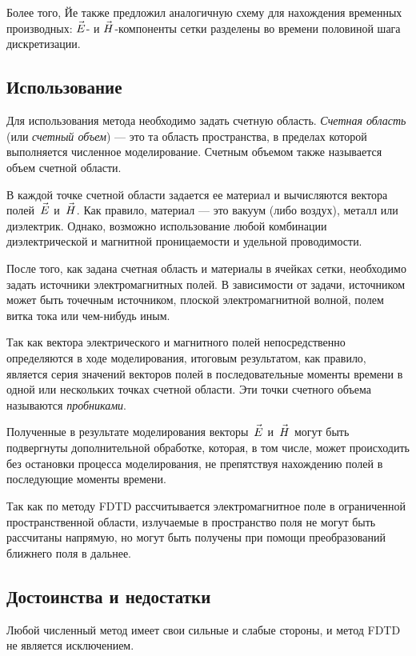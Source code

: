 Более того, Йе также предложил аналогичную схему для нахождения временных
производных: $\vec{E\mathstrut}$- и $\vec{H\mathstrut}$-компоненты сетки разделены во времени
половиной шага дискретизации.


\subsection{Использование}

Для использования метода необходимо задать счетную область.
\emph{Счетная область} (или \emph{счетный объем}) --- это та область
пространства, в пределах которой выполняется численное моделирование.
Счетным объемом также называется объем счетной области.

В каждой точке счетной области задается ее материал и вычисляются вектора
полей~$\vec{E\mathstrut}$ и~$\vec{H\mathstrut}$. Как правило, материал --- это вакуум (либо
воздух), металл или диэлектрик. Однако, возможно использование любой комбинации
диэлектрической и магнитной проницаемости и удельной проводимости.

После того, как задана счетная область и материалы в ячейках сетки, необходимо
задать источники электромагнитных полей. В зависимости от задачи, источником
может быть точечным источником, плоской электромагнитной волной, полем витка
тока или чем-нибудь иным.

Так как вектора электрического и магнитного полей непосредственно определяются
в ходе моделирования, итоговым результатом, как правило, является серия значений
векторов полей в последовательные моменты времени в одной или нескольких точках
счетной области. Эти точки счетного объема называются \emph{пробниками}.

Полученные в результате моделирования векторы~$\vec{E\mathstrut}$ и~$\vec{H\mathstrut}$ могут быть
подвергнуты дополнительной обработке, которая, в том числе, может
происходить без остановки процесса моделирования, не препятствуя нахождению полей
в последующие моменты времени.

Так как по методу FDTD рассчитывается электромагнитное поле в ограниченной
пространственной области, излучаемые в пространство поля не могут быть рассчитаны
напрямую, но могут быть получены при помощи преобразований ближнего поля в дальнее.

\subsection{Достоинства и недостатки}

Любой численный метод имеет свои сильные и слабые стороны,
и метод FDTD не является исключением.

